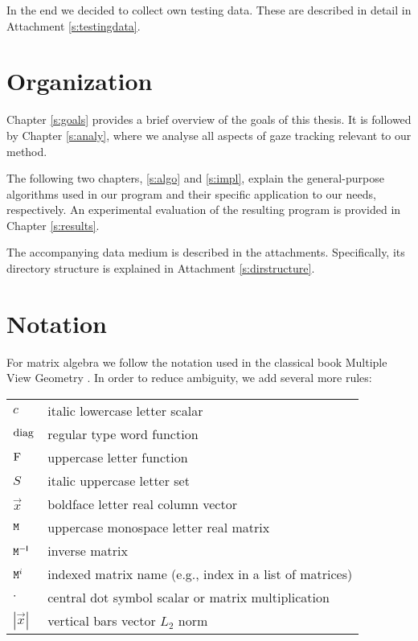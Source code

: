 In the end we decided to collect own testing data.
These are described in detail in Attachment \ref{s:testingdata}.

\section{Organization}
Chapter \ref{s:goals} provides a brief overview of the goals of this thesis.
It is followed by Chapter \ref{s:analy}, where we analyse all aspects of gaze tracking relevant to our method.

The following two chapters, \ref{s:algo} and \ref{s:impl}, explain the general-purpose algorithms used in our program and their specific application to our needs, respectively.
An experimental evaluation of the resulting program is provided in Chapter \ref{s:results}.

The accompanying data medium is described in the attachments.
Specifically, its directory structure is explained in Attachment \ref{s:dirstructure}.

\section{Notation}

For matrix algebra we follow the notation used in the classical book Multiple View Geometry \cite{hartley03}.
In order to reduce ambiguity, we add several more rules:

\begin{table}[h!]
\centering
\begin{tabularx}{\textwidth}{lX}
$c$ & italic lowercase letter \dotfill scalar \\
$\mathrm{diag}$ & regular type word \dotfill function \\
$\mathrm{F}$ & uppercase letter \dotfill function \\
$S$ & italic uppercase letter \dotfill set \\
$\vec x$ & boldface letter \dotfill real column vector \\
$\mathtt{M}$ & uppercase monospace letter \dotfill real matrix \\
$\mathtt{M}^{-\mathsf{I}}$ & \dotfill inverse matrix \\
$\mathtt{M}^i$ & \dotfill indexed matrix name (e.g., index in a list of matrices) \\
$\cdot$ & central dot symbol \dotfill scalar or matrix multiplication \\
$|\vec x|$ & vertical bars \dotfill vector $L_2$ norm \\
\end{tabularx}
\end{table}
